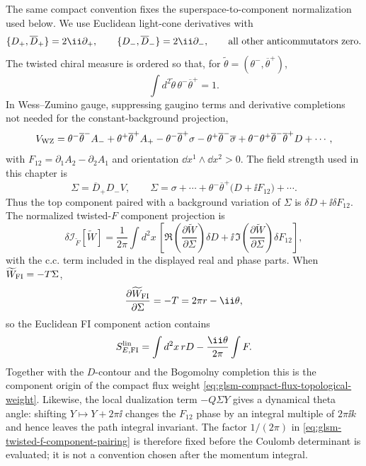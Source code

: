 \begin{remark}
\label{rem:glsm-twisted-f-component-normalization}
The same compact convention fixes the superspace-to-component normalization used
below.  We use Euclidean light-cone derivatives with
\[
  \{D_+,\overline D_+\}=2\ii\partial_+,\qquad
  \{D_-,\overline D_-\}=2\ii\partial_-,
  \qquad
  \hbox{all other anticommutators zero}.
\]
The twisted chiral measure is ordered so that, for
\(\widetilde\theta=(\theta^-,\overline\theta^+)\),
\[
  \int d^2\widetilde\theta\,
  \theta^-\overline\theta^+=1 .
\]
In Wess--Zumino gauge, suppressing gaugino terms and derivative completions not
needed for the constant-background projection,
\[
  V_{\rm WZ}
  =
  \theta^-\overline\theta^- A_-
  +\theta^+\overline\theta^+ A_+
  -\theta^-\overline\theta^+\sigma
  -\theta^+\overline\theta^-\overline\sigma
  +\theta^-\theta^+\overline\theta^-\overline\theta^+D+\cdots ,
\]
with \(F_{12}=\partial_1A_2-\partial_2A_1\) and orientation
\(\dd x^1\wedge\dd x^2>0\).  The field strength used in this chapter is
\begin{equation}
  \Sigma=\overline D_+D_-V,
  \qquad
  \Sigma
  =
  \sigma+\cdots+
  \theta^-\overline\theta^+\bigl(D+\ii F_{12}\bigr)+\cdots .
  \label{eq:glsm-sigma-component-normalization}
\end{equation}
Thus the top component paired with a background variation of \(\Sigma\) is
\(\delta D+\ii\delta F_{12}\).  The normalized twisted-\(F\) component
projection is
\begin{equation}
  \delta{\mathcal I}_{\widetilde F}[\widetilde W]
  =
  \frac1{2\pi}
  \int d^2x\,
  \left[
    \Re\left(
      \frac{\partial\widetilde W}{\partial\Sigma}\right)\delta D
    +\ii\,
    \Im\left(
      \frac{\partial\widetilde W}{\partial\Sigma}\right)
    \delta F_{12}
  \right],
  \label{eq:glsm-twisted-f-component-pairing}
\end{equation}
with the c.c. term included in the displayed real and phase parts.  When
\(\widetilde W_{\rm FI}=-T\Sigma\),
\[
  \frac{\partial\widetilde W_{\rm FI}}{\partial\Sigma}
  =
  -T=2\pi r-\ii\theta ,
\]
so the Euclidean FI component action contains
\[
  S_{E,{\rm FI}}^{\rm lin}
  =
  \int d^2x\, rD
  -\frac{\ii\theta}{2\pi}\int F .
\]
Together with the \(D\)-contour and the Bogomolny completion this is the
component origin of the compact flux weight
\eqref{eq:glsm-compact-flux-topological-weight}.  Likewise, the local
dualization term
\(-Q\Sigma Y\) gives a dynamical theta angle: shifting
\(Y\mapsto Y+2\pi\ii\) changes the \(F_{12}\) phase by an integral multiple of
\(2\pi\ii k\) and hence leaves the path integral invariant.  The factor
\(1/(2\pi)\) in
\eqref{eq:glsm-twisted-f-component-pairing} is therefore fixed before the
Coulomb determinant is evaluated; it is not a convention chosen after the
momentum integral.
\end{remark}

